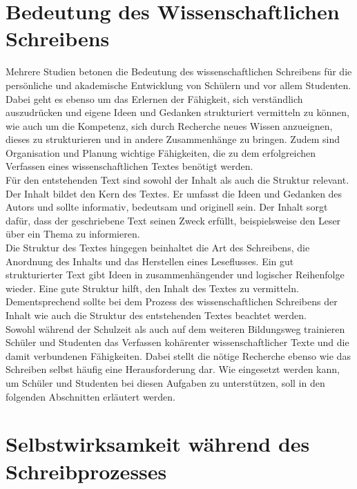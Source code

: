 \documentclass[../main.tex]{subfiles}
\begin{document}
\section{Bedeutung des Wissenschaftlichen Schreibens}
\label{sec:bedeutung}
Mehrere Studien betonen die Bedeutung des wissenschaftlichen Schreibens für die persönliche und akademische Entwicklung 
von Schülern und vor allem Studenten\cite{influencingUsingAi,ZukunftWissenschaftlichesPublizieren}. Dabei geht es ebenso um das Erlernen der Fähigkeit, sich verständlich auszudrücken und 
eigene Ideen und Gedanken strukturiert vermitteln zu können, wie auch um die Kompetenz, sich durch Recherche neues Wissen 
anzueignen, dieses zu strukturieren und in andere Zusammenhänge zu bringen. Zudem sind Organisation und Planung 
wichtige Fähigkeiten, die zu dem erfolgreichen Verfassen eines wissenschaftlichen Textes benötigt werden.\cite{SelfEfficacyBeliefs} \\
Für den entstehenden Text sind sowohl der Inhalt als auch die Struktur relevant. Der Inhalt bildet den Kern des Textes. Er umfasst die Ideen und Gedanken des Autors und sollte 
informativ, bedeutsam und originell sein. Der Inhalt sorgt dafür, dass der geschriebene Text seinen Zweck erfüllt, beispielsweise 
den Leser über ein Thema zu informieren. \\
Die Struktur des Textes hingegen beinhaltet die Art des Schreibens, die Anordnung des Inhalts und das Herstellen eines Leseflusses. 
Ein gut strukturierter Text gibt Ideen in zusammenhängender und logischer Reihenfolge wieder. Eine gute Struktur hilft, den Inhalt des
Textes zu vermitteln. Dementsprechend sollte bei dem Prozess des wissenschaftlichen Schreibens der Inhalt wie auch die Struktur des entstehenden 
Textes beachtet werden.\cite{teachers}\\
Sowohl während der Schulzeit als auch auf dem weiteren Bildungsweg trainieren Schüler und Studenten das Verfassen kohärenter 
wissenschaftlicher Texte und die damit verbundenen Fähigkeiten. Dabei stellt die nötige Recherche ebenso wie das Schreiben selbst
häufig eine Herausforderung dar. Wie  eingesetzt werden kann, um Schüler und Studenten bei diesen Aufgaben zu 
unterstützen, soll in den folgenden Abschnitten erläutert werden. 

\section{Selbstwirksamkeit während des Schreibprozesses}
\label{sec:efficacy}
\end{document}
